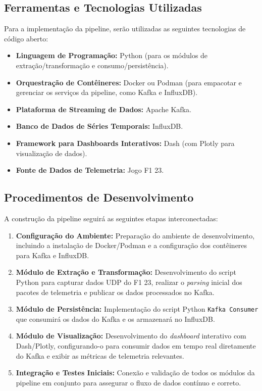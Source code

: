 \documentclass[12pt, %
openright, 
oneside, %
a4paper,    %
brazil]{facom-ufu-abntex2}
\begin{document}
\subsection{Ferramentas e Tecnologias Utilizadas}
Para a implementação da pipeline, serão utilizadas as seguintes tecnologias de código aberto:
\begin{itemize}
    \item \textbf{Linguagem de Programação:} Python (para os módulos de extração/transformação e consumo/persistência).
    \item \textbf{Orquestração de Contêineres:} Docker ou Podman (para empacotar e gerenciar os serviços da pipeline, como Kafka e InfluxDB).
    \item \textbf{Plataforma de Streaming de Dados:} Apache Kafka.
    \item \textbf{Banco de Dados de Séries Temporais:} InfluxDB.
    \item \textbf{Framework para Dashboards Interativos:} Dash (com Plotly para visualização de dados).
    \item \textbf{Fonte de Dados de Telemetria:} Jogo F1 23.
\end{itemize}

\subsection{Procedimentos de Desenvolvimento}
A construção da pipeline seguirá as seguintes etapas interconectadas:
\begin{enumerate}
    \item \textbf{Configuração do Ambiente:} Preparação do ambiente de desenvolvimento, incluindo a instalação de Docker/Podman e a configuração dos contêineres para Kafka e InfluxDB.
    \item \textbf{Módulo de Extração e Transformação:} Desenvolvimento do script Python para capturar dados UDP do F1 23, realizar o \textit{parsing} inicial dos pacotes de telemetria e publicar os dados processados no Kafka.
    \item \textbf{Módulo de Persistência:} Implementação do script Python \texttt{Kafka Consumer} que consumirá os dados do Kafka e os armazenará no InfluxDB.
    \item \textbf{Módulo de Visualização:} Desenvolvimento do \textit{dashboard} interativo com Dash/Plotly, configurando-o para consumir dados em tempo real diretamente do Kafka e exibir as métricas de telemetria relevantes.
    \item \textbf{Integração e Testes Iniciais:} Conexão e validação de todos os módulos da pipeline em conjunto para assegurar o fluxo de dados contínuo e correto.
\end{enumerate}
\end{document}
